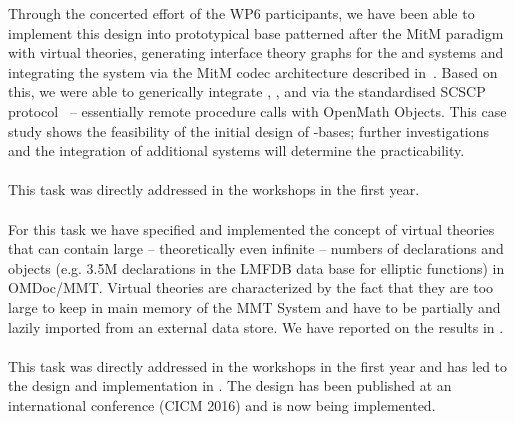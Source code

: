 \documentclass{deliverablereport}
\begin{document}
  Through the concerted effort of the WP6 participants, we have been able to implement
  this design into prototypical \DKS base patterned after the MitM paradigm with virtual
  theories, generating interface theory graphs for the \GAP and \Sage systems and
  integrating the \LMFDB system via the MitM codec architecture described
  in~\cite{ODK-D6.2}. Based on this, we were able to generically integrate \GAP, \Sage,
  and \LMFDB via the standardised SCSCP protocol~\cite{HorRoz:ossp09} -- essentially
  remote procedure calls with OpenMath Objects. This case study shows the feasibility of
  the initial design of \DKS-bases; further investigations and the integration of
  additional systems will determine the practicability.

  \paragraph{}
  This task was directly addressed in the  workshops in the first year.
  
  \paragraph{}
  For this task we have specified and implemented the concept of virtual theories that can
  contain large -- theoretically even infinite -- numbers of declarations and objects
  (e.g. 3.5M declarations in the LMFDB data base for elliptic functions) in
  OMDoc/MMT. Virtual theories are characterized by the fact that they are too large to
  keep in main memory of the MMT System and have to be partially and lazily imported from
  an external data store. We have reported on the results in .

  \paragraph{}
  This task was directly addressed in the  workshops in the first year and
  has led to the design and implementation in . The design has
  been published at an international conference (CICM 2016) and is now being implemented.
  
\end{document}
